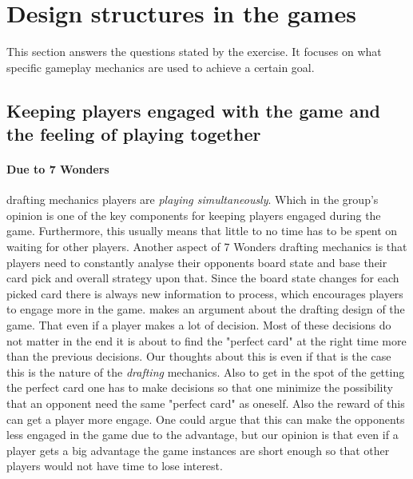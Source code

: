 \documentclass[a4paper]{article}
\begin{document}
\section{Design structures in the games}
This section answers the questions stated by the exercise. It focuses on what specific gameplay mechanics are used to achieve a certain goal. 

\subsection{Keeping players engaged with the game and the feeling of playing together}
\paragraph{Due to 7 Wonders} drafting mechanics players are \textit{playing simultaneously}. Which in the group's opinion is one of the key components for keeping players engaged during the game. Furthermore, this usually means that little to no time has to be spent on waiting for other players. Another aspect of 7 Wonders drafting mechanics is that players need to constantly analyse their opponents board state and base their card pick and overall strategy upon that. Since the board state changes for each picked card there is always new information to process, which encourages players to engage more in the game.
 makes an argument about the drafting design of the game.
That even if a player makes a lot of decision.
Most of these decisions do not matter in the end it is about to find the "perfect card" at the right time more than the previous decisions.
Our thoughts about this is even if that is the case this is the nature of the \textit{drafting} mechanics.
Also to get in the spot of the getting the perfect card one has to make decisions so that one minimize the possibility that an opponent need the same "perfect card" as oneself.
Also the reward of this can get a player more engage. One could argue that this can make the opponents less engaged in the game due to the advantage, but our opinion is that even if a player gets a big advantage the game instances are short enough so that other players would not have time to lose interest.  
\end{document}

